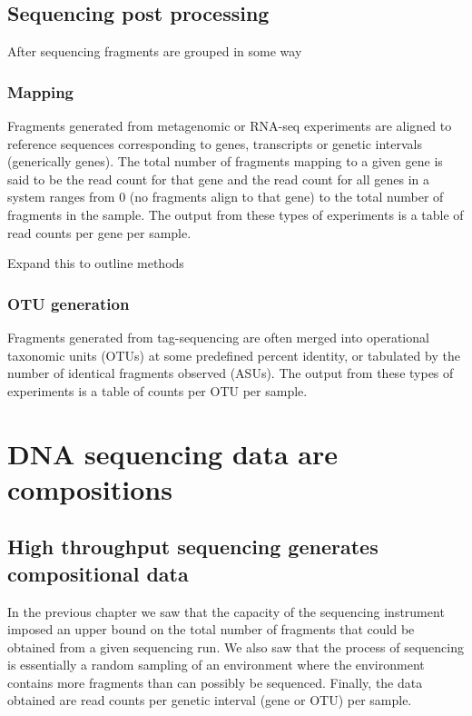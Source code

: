 \documentclass[twocolumn]{article}
\begin{document}
\subsection{Sequencing post
processing}\label{sequencing-post-processing}

After sequencing fragments are grouped in some way

\subsubsection{Mapping}\label{mapping}

Fragments generated from metagenomic or RNA-seq experiments are aligned
to reference sequences corresponding to genes, transcripts or genetic
intervals (generically genes). The total number of fragments mapping to
a given gene is said to be the read count for that gene and the read
count for all genes in a system ranges from 0 (no fragments align to
that gene) to the total number of fragments in the sample. The output
from these types of experiments is a table of read counts per gene per
sample.

Expand this to outline methods

\subsubsection{OTU generation}\label{otu-generation}

Fragments generated from tag-sequencing are often merged into
operational taxonomic units (OTUs) at some predefined percent identity,
or tabulated by the number of identical fragments observed (ASUs). The
output from these types of experiments is a table of counts per OTU per
sample. \clearpage

\section{DNA sequencing data are
compositions}\label{dna-sequencing-data-are-compositions}

\subsection{High throughput sequencing generates compositional
data}\label{high-throughput-sequencing-generates-compositional-data}

In the previous chapter we saw that the capacity of the sequencing
instrument imposed an upper bound on the total number of fragments that
could be obtained from a given sequencing run. We also saw that the
process of sequencing is essentially a random sampling of an environment
where the environment contains more fragments than can possibly be
sequenced. Finally, the data obtained are read counts per genetic
interval (gene or OTU) per sample.
\end{document}
